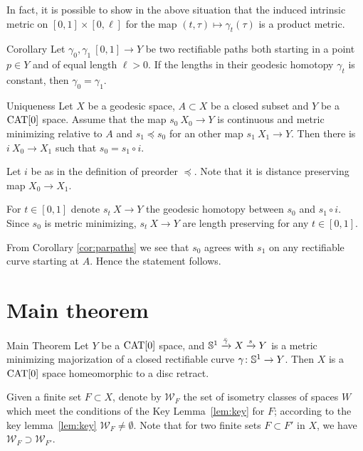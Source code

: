 \documentclass{article}
\begin{document}
In fact, it is possible to show in the above situation that the induced intrinsic metric on $[0,1]\times[0,\ell]$
for the map $(t,\tau)\mapsto \gamma_t(\tau)$ is a product metric.

\begin{thm}{Corollary}\label{cor:parpaths}
Let $\gamma_0,\gamma_1\:[0,1]\to Y$ be two rectifiable paths both starting in a point $p\in Y$ and of equal length $\ell>0$. 
If the lengths in their geodesic homotopy $\gamma_t$ is constant, then $\gamma_{0}=\gamma_{1}$.
\end{thm}

\begin{thm}{Uniqueness}\label{prop:strict-mm}
Let $X$ be a geodesic space, 
$A\subset X$ be a closed subset 
and $Y$ be a $\mathop{\rm CAT}\nolimits[0]$ space.
Assume that the map $s_0\:X_0\to Y$ is continuous and metric minimizing relative to $A$ and 
$s_1\preccurlyeq s_0$ for an other map $s_1\:X_1\to Y$.
Then there is $i\:X_0\to X_1$ such that $s_0=s_1\circ i$.
\end{thm}

Let $i$ be as in the definition of preorder  $\preccurlyeq$.
Note that it is distance preserving map $X_0\to X_1$.

For $t\in[0,1]$ denote $s_t\:X\to Y$ the geodesic homotopy between $s_0$ and $s_1\circ i$. 
Since $s_0$ is metric minimizing, $s_t\:X\to Y$ are length preserving for any $t\in[0,1]$.

From Corollary \ref{cor:parpaths} we see that $s_0$ agrees with $s_1$ on any rectifiable curve starting at $A$.
Hence the statement follows.
\qeds

\section{Main theorem}\label{Main theorem}

\begin{thm}{Main Theorem}\label{thm:main}
Let $Y$ be a $\mathop{\rm CAT}\nolimits[0]$ space, 
and $\mathbb{S}^1\xrightarrow{\bar\gamma}X\xrightarrow{s}Y $ is a metric minimizing majorization of a closed rectifiable curve $\gamma\colon\mathbb{S}^1\to Y$.
Then $X$ is a $\mathop{\rm CAT}\nolimits[0]$ space homeomorphic to a disc retract. 
\end{thm}

Given a finite set $F\subset X$,
denote by $\mathcal{W}_F$
the set of isometry classes of spaces $W$ which meet the conditions of the Key Lemma~\ref{lem:key}
for $F$;
according to the key lemma~\ref{lem:key} $\mathcal{W}_F\ne\emptyset$.
Note that for two finite sets $F\subset F'$ in $X$,
we have $\mathcal{W}_F\supset \mathcal{W}_{F'}$.
\end{document}
